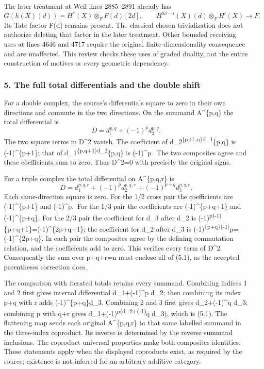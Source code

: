 \documentclass[11pt]{article}
\begin{document}
The later treatment at Weil lines 2885--2891 already has \[
G(h(X)(d))=H^*(X)\otimes_F F(d)[2d],
\qquad
H^{2d-i}(X)(d)\otimes_F H^i(X)\longrightarrow F.
\] Its Tate factor F(d) remains present. The classical chosen trivialization does not authorize deleting that factor in the later treatment. Other bounded receiving uses at lines 4646 and 4717 require the original finite-dimensionality consequence and are unaffected. This review checks these uses of graded duality, not the entire construction of motives or every geometric dependency.

\subsubsection{5. The full total differentials and the double shift}\label{the-full-total-differentials-and-the-double-shift}

For a double complex, the source's differentials square to zero in their own directions and commute in the two directions. On the summand A\^{}\{p,q\} the total differential is \[
D=d_1^{p,q}+(-1)^p d_2^{p,q}.
\] The two square terms in D\^{}2 vanish. The coefficient of d\_2\textsuperscript{\{p+1,q\}d\_1}\{p,q\} is (-1)\^{}\{p+1\}; that of d\_1\textsuperscript{\{p,q+1\}d\_2}\{p,q\} is (-1)\^{}p.~The two composites agree and these coefficients sum to zero. Thus D\^{}2=0 with precisely the original signs.

For a triple complex the total differential on A\^{}\{p,q,r\} is \[
D=d_1^{p,q,r}+(-1)^p d_2^{p,q,r}
                    +(-1)^{p+q}d_3^{p,q,r}.              \tag{5.1}
\] Each same-direction square is zero. For the 1/2 cross pair the coefficients are (-1)\^{}\{p+1\} and (-1)\^{}p.~For the 1/3 pair the coefficients are (-1)\^{}\{p+q+1\} and (-1)\^{}\{p+q\}. For the 2/3 pair the coefficient for d\_3 after d\_2 is (-1)\textsuperscript{p(-1)}\{p+q+1\}=(-1)\^{}\{2p+q+1\}; the coefficient for d\_2 after d\_3 is (-1)\textsuperscript{\{p+q\}(-1)}p=(-1)\^{}\{2p+q\}. In each pair the composites agree by the defining commutation relation, and the coefficients add to zero. This verifies every term of D\^{}2. Consequently the sum over p+q+r=n must enclose all of (5.1), as the accepted parentheses correction does.

The comparison with iterated totals retains every summand. Combining indices 1 and 2 first gives internal differential d\_1+(-1)\^{}p d\_2; then combining its index p+q with r adds (-1)\^{}\{p+q\}d\_3. Combining 2 and 3 first gives d\_2+(-1)\^{}q d\_3; combining p with q+r gives d\_1+(-1)\textsuperscript{p(d\_2+(-1)}q d\_3), which is (5.1). The flattening map sends each original A\^{}\{p,q,r\} to that same labelled summand in the three-index coproduct. Its inverse is determined by the reverse summand inclusions. The coproduct universal properties make both composites identities. These statements apply when the displayed coproducts exist, as required by the source; existence is not inferred for an arbitrary additive category.
\end{document}

